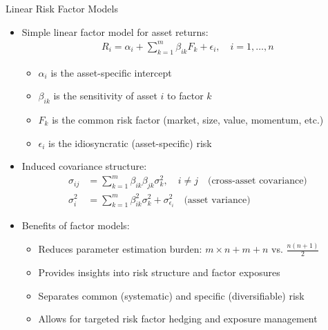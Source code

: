 \documentclass[10pt]{beamer}
\begin{document}
\begin{frame}{Linear Risk Factor Models}
  \begin{itemize}[<+->]
    \item Simple linear factor model for asset returns:
      \vspace{-2mm}
      \begin{align*}
        R_i = \alpha_i + \sum_{k=1}^{m} \beta_{ik}F_k + \epsilon_i, \quad i = 1, \ldots, n
      \end{align*}
      \vspace{-4mm}
      \begin{itemize}
        \item $\alpha_i$ is the asset-specific intercept
        \item $\beta_{ik}$ is the sensitivity of asset $i$ to factor $k$
        \item $F_k$ is the common risk factor (market, size, value, momentum, etc.)
        \item $\epsilon_i$ is the idiosyncratic (asset-specific) risk
      \end{itemize}
      
    \item Induced covariance structure:
      \begin{align*}
        \sigma_{ij} &= \sum_{k=1}^{m} \beta_{ik}\beta_{jk}\sigma_k^2, \quad i \neq j \quad \text{(cross-asset covariance)}\\
        \sigma_i^2 &= \sum_{k=1}^{m} \beta_{ik}^2\sigma_k^2 + \sigma_{\epsilon_i}^2 \quad \text{(asset variance)}
      \end{align*}
      \vspace{-3mm}
    \item Benefits of factor models:
      \begin{itemize}
        \item Reduces parameter estimation burden: $m \times n + m + n$ vs. $\frac{n(n+1)}{2}$
        \item Provides insights into risk structure and factor exposures
        \item Separates common (systematic) and specific (diversifiable) risk
        \item Allows for targeted risk factor hedging and exposure management
      \end{itemize}
  \end{itemize}
\end{frame}
\end{document}
